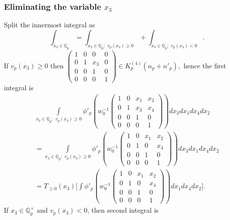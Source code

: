 \documentclass[11pt]{amsart}
\newcommand{\mirp}[1]{K_p^{(4)}(#1)}
\begin{document}
\subsubsection{Eliminating the variable $x_3$}
Split the innermost integral as 
$$
\int_{x_3 \in \mathbb{Q}_p} = \int_{x_3 \in \mathbb{Q}_p:\,\, v_p(x_3) \geq  0} + \int_{x_3 \in \mathbb{Q}_p:\,\, v_p(x_3) < 0}.
$$
If $v_p(x_3) \geq 0$ then
$\left(\begin{smallmatrix}
		1 & 0 & 0 & 0 \\
		0 & 1 & x_{3} & 0 \\
		0 & 0 & 1 & 0 \\
		0 & 0 & 0 & 1
	\end{smallmatrix}\right) \in \mirp{n_p + n'_p},$ hence the first integral is 
\begin{multline}
	\int
	\limits_{x_3 \in \mathbb{Q}_p:\,\, v_p(x_3) \geq 0} \phi'_p\left(w_0^{-1} \left(\begin{smallmatrix}
		1 & 0 & x_{1} & x_{2} \\
		0 & 1 & x_{3} & x_{4} \\
		0 & 0 & 1 & 0 \\
		0 & 0 & 0 & 1
	\end{smallmatrix}\right) \right) dx_3 dx_1 dx_4 dx_2  \\ = \int
	\limits_{x_3 \in \mathbb{Q}_p:\,\, v_p(x_3) \geq 0} \phi'_p\left(w_0^{-1} \left(\begin{smallmatrix}
		1 & 0 & x_{1} & x_{2} \\
		0 & 1 & 0 & x_{4} \\
		0 & 0 & 1 & 0 \\
		0 & 0 & 0 & 1
	\end{smallmatrix}\right) \right) dx_3 dx_1 dx_4 dx_2 \\ = T_{\geq 0}(x_3)\biggl[\int \phi'_p\left(w_0^{-1} \left(\begin{smallmatrix}
	1 & 0 & x_{1} & x_{2} \\
	0 & 1 & 0 & x_{4} \\
	0 & 0 & 1 & 0 \\
	0 & 0 & 0 & 1
	\end{smallmatrix}\right)  \right) dx_1 dx_4 dx_2 \biggr].  \label{eqn: x3-geq-0}
\end{multline}
If $x_3 \in \mathbb{Q}_p^\times $ and $v_p(x_3) < 0$, then second integral is
\end{document}
